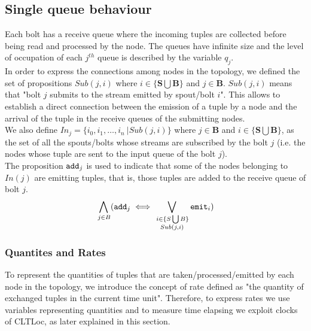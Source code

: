 \newpage
\subsection*{Single queue behaviour}

Each bolt has a receive queue where the incoming tuples are collected before being read and processed by the node.
The queues have infinite size and the level of occupation of each $j^{th}$ queue is described by the variable $q_j$.\\
In order to express the connections among nodes in the topology, we defined the set of propositions $Sub(j,i)$ where $i \in \{ \mathbf{S} \bigcup \mathbf{B}\}$ and $j \in \mathbf{B}$. $Sub(j,i)$ means that "bolt $j$ submits to the stream emitted by spout/bolt $i$". This allows to establish a direct connection between the emission of a tuple by a node and the arrival of the tuple in the receive queues of the submitting nodes.\\
We also define $In_j=\{i_0,i_1, \dots, i_n\ | Sub(j,i) \}$ where $j\in \mathbf{B}$ and $i \in \{ \mathbf{S}\bigcup\mathbf{B}\}$, as the set of all the spouts/bolts whose streams are subscribed by the bolt $j$ (i.e. the nodes whose tuple are sent to the input queue of the bolt $j$).\\
The proposition $\mathtt{add}_{j}$ is used to indicate that some of the nodes belonging to $In(j)$ are emitting tuples, that is, those tuples are added to the receive queue of bolt $j$.
\begin{align*}
 \bigwedge_{
\begin{subarray}{c}
\,j \in B
\end{subarray}
} ( \mathtt{add}_{j} \iff 
\bigvee_{
\begin{subarray}{c}
\,i \in \{S \bigcup B \}\\
Sub(j,i)
\end{subarray}
 } \mathtt{emit}_{i})
\end{align*}
\subsubsection*{Quantites and Rates}
To represent the quantities of tuples that are taken/processed/emitted by each node in the topology, we introduce the concept of rate defined as "the quantity of exchanged tuples  in the current time unit". 
Therefore, to express rates we use variables representing quantities and to measure time elapsing we exploit clocks of CLTLoc, as later explained in this section.

